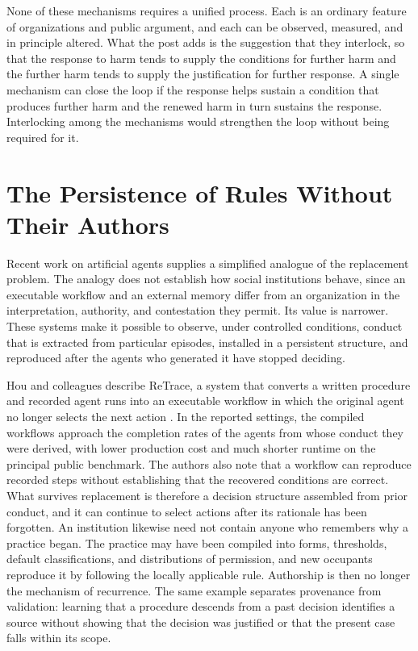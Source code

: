 \documentclass[11pt]{article}
\theoremstyle{definition}
\begin{document}
None of these mechanisms requires a unified process. Each is an ordinary feature of organizations and public argument, and each can be observed, measured, and in principle altered. What the post adds is the suggestion that they interlock, so that the response to harm tends to supply the conditions for further harm and the further harm tends to supply the justification for further response. A single mechanism can close the loop if the response helps sustain a condition that produces further harm and the renewed harm in turn sustains the response. Interlocking among the mechanisms would strengthen the loop without being required for it.

\section{The Persistence of Rules Without Their Authors}

Recent work on artificial agents supplies a simplified analogue of the replacement problem. The analogy does not establish how social institutions behave, since an executable workflow and an external memory differ from an organization in the interpretation, authority, and contestation they permit. Its value is narrower. These systems make it possible to observe, under controlled conditions, conduct that is extracted from particular episodes, installed in a persistent structure, and reproduced after the agents who generated it have stopped deciding.

Hou and colleagues describe ReTrace, a system that converts a written procedure and recorded agent runs into an executable workflow in which the original agent no longer selects the next action \cite{hou2026}. In the reported settings, the compiled workflows approach the completion rates of the agents from whose conduct they were derived, with lower production cost and much shorter runtime on the principal public benchmark. The authors also note that a workflow can reproduce recorded steps without establishing that the recovered conditions are correct. What survives replacement is therefore a decision structure assembled from prior conduct, and it can continue to select actions after its rationale has been forgotten. An institution likewise need not contain anyone who remembers why a practice began. The practice may have been compiled into forms, thresholds, default classifications, and distributions of permission, and new occupants reproduce it by following the locally applicable rule. Authorship is then no longer the mechanism of recurrence. The same example separates provenance from validation: learning that a procedure descends from a past decision identifies a source without showing that the decision was justified or that the present case falls within its scope.
\end{document}
